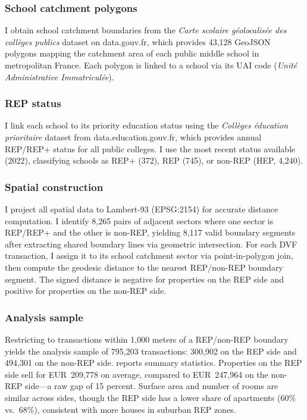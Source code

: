 \documentclass[12pt]{article}
\begin{document}
\subsubsection*{School catchment polygons} I obtain school catchment boundaries from the \textit{Carte scolaire g\'{e}olocalis\'{e}e des coll\`{e}ges publics} dataset on data.gouv.fr, which provides 43,128 GeoJSON polygons mapping the catchment area of each public middle school in metropolitan France. Each polygon is linked to a school via its UAI code (\textit{Unit\'{e} Administrative Immatricul\'{e}e}).

\subsubsection*{REP status} I link each school to its priority education status using the \textit{Coll\`{e}ges \'{e}ducation prioritaire} dataset from data.education.gouv.fr, which provides annual REP/REP+ status for all public colleges. I use the most recent status available (2022), classifying schools as REP+ (372), REP (745), or non-REP (HEP, 4,240).

\subsubsection*{Spatial construction} I project all spatial data to Lambert-93 (EPSG:2154) for accurate distance computation. I identify 8,265 pairs of adjacent sectors where one sector is REP/REP+ and the other is non-REP, yielding 8,117 valid boundary segments after extracting shared boundary lines via geometric intersection. For each DVF transaction, I assign it to its school catchment sector via point-in-polygon join, then compute the geodesic distance to the nearest REP/non-REP boundary segment. The signed distance is negative for properties on the REP side and positive for properties on the non-REP side.

\subsubsection*{Analysis sample} Restricting to transactions within 1,000 meters of a REP/non-REP boundary yields the analysis sample of 795,203 transactions: 300,902 on the REP side and 494,301 on the non-REP side.  reports summary statistics. Properties on the REP side sell for EUR~209,778 on average, compared to EUR~247,964 on the non-REP side---a raw gap of 15 percent. Surface area and number of rooms are similar across sides, though the REP side has a lower share of apartments (60\% vs.\ 68\%), consistent with more houses in suburban REP zones.
\end{document}
